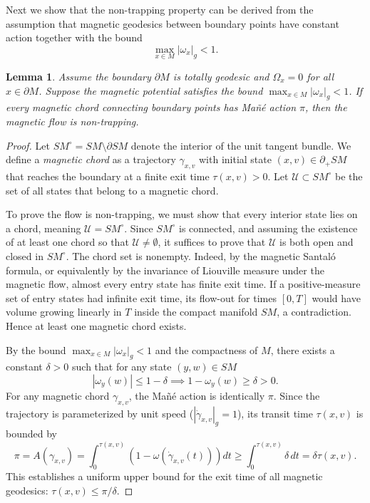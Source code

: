 \documentclass[12pt]{amsart}
\numberwithin{equation}{section}
\newtheorem{lemma}[theorem]{Lemma}
\begin{document}
Next we show that the non-trapping property can be derived from the assumption that magnetic geodesics between boundary points have constant action together with the bound
\begin{equation}
\max_{x\in M}|\omega_{x}|_{g}<1.
\end{equation}

\begin{lemma} \label{lem:non_trapping}
Assume the boundary $\partial M$ is totally geodesic and $\Omega_x = 0$ for all $x \in \partial M$. Suppose the magnetic potential satisfies the bound $\max_{x \in M} |\omega_x|_g < 1$. If every magnetic chord connecting boundary points has Ma\~n\'e action $\pi$, then the magnetic flow is non-trapping. \label{lemma4.13}
\end{lemma}

\begin{proof}
Let $SM^\circ = SM \setminus \partial SM$ denote the interior of the unit tangent bundle. We define a \textit{magnetic chord} as a trajectory $\gamma_{x,v}$ with initial state $(x,v) \in \partial_+ SM$ that reaches the boundary at a finite exit time $\tau(x,v) > 0$. Let $\mathcal{U} \subset SM^\circ$ be the set of all states that belong to a magnetic chord.

To prove the flow is non-trapping, we must show that every interior state lies on a chord, meaning $\mathcal{U} = SM^\circ$. Since $SM^\circ$ is connected, and assuming the existence of at least one chord so that $\mathcal{U} \neq \emptyset$, it suffices to prove that $\mathcal{U}$ is both open and closed in $SM^\circ$. The chord set is nonempty. Indeed, by the magnetic Santaló formula, or equivalently by the invariance of Liouville measure under the magnetic flow, almost every entry state has finite exit time. If a positive-measure set of entry states had infinite exit time, its flow-out for times $[0,T]$ would have volume growing linearly in $T$ inside the compact manifold $SM$, a contradiction. Hence at least one magnetic chord exists.

By the bound $\max_{x \in M} |\omega_x|_g < 1$ and the compactness of $M$, there exists a constant $\delta > 0$ such that for any state $(y,w) \in SM$
\begin{equation}
    |\omega_y(w)| \le 1 - \delta \implies 1 - \omega_y(w) \ge \delta > 0.
\end{equation}
For any magnetic chord $\gamma_{x,v}$, the Ma\~n\'e action is identically $\pi$. Since the trajectory is parameterized by unit speed ($|\dot{\gamma}_{x,v}|_g = 1$), its transit time $\tau(x,v)$ is bounded by
\begin{equation}
    \pi = A(\gamma_{x,v}) = \int_0^{\tau(x,v)} \left( 1 - \omega(\dot{\gamma}_{x,v}(t)) \right) dt \ge \int_0^{\tau(x,v)} \delta \, dt = \delta \tau(x,v).
\end{equation}
This establishes a uniform upper bound for the exit time of all magnetic geodesics: $\tau(x,v) \le \pi / \delta$.


\end{proof}
\end{document}
